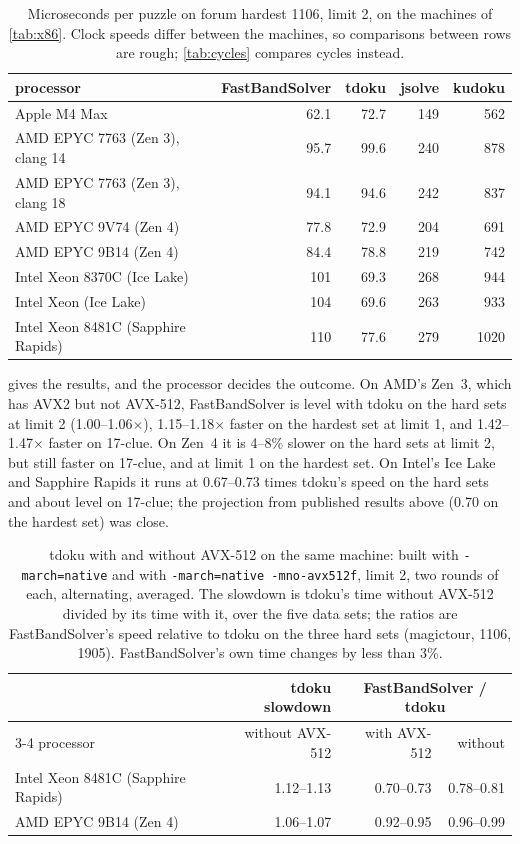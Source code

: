 \documentclass[11pt]{article}
\theoremstyle{definition}
\theoremstyle{plain}
\begin{document}
\begin{table}[t]
\centering
\caption{Microseconds per puzzle on forum hardest 1106, limit 2, on the machines of \cref{tab:x86}. Clock speeds differ
between the machines, so comparisons between rows are rough; \cref{tab:cycles} compares cycles instead.}
\label{tab:x86times}
\small
\begin{tabular}{lrrrr}
\toprule
processor & FastBandSolver & tdoku & jsolve & kudoku \\
\midrule
Apple M4 Max & 62.1 & 72.7 & 149 & 562 \\
\midrule
AMD EPYC 7763 (Zen 3), clang 14 & 95.7 & 99.6 & 240 & 878 \\
AMD EPYC 7763 (Zen 3), clang 18 & 94.1 & 94.6 & 242 & 837 \\
AMD EPYC 9V74 (Zen 4) & 77.8 & 72.9 & 204 & 691 \\
AMD EPYC 9B14 (Zen 4) & 84.4 & 78.8 & 219 & 742 \\
Intel Xeon 8370C (Ice Lake) & 101 & 69.3 & 268 & 944 \\
Intel Xeon (Ice Lake) & 104 & 69.6 & 263 & 933 \\
Intel Xeon 8481C (Sapphire Rapids) & 110 & 77.6 & 279 & 1020 \\
\bottomrule
\end{tabular}
\end{table}

 gives the results, and the processor decides the outcome. On AMD's Zen~3, which has AVX2 but not
AVX-512, FastBandSolver is level with tdoku on the hard sets at limit 2 (1.00--1.06$\times$), 1.15--1.18$\times$
faster on the hardest set at limit 1, and 1.42--1.47$\times$ faster on 17-clue. On Zen~4 it is 4--8\% slower on the
hard sets at limit 2, but still faster on 17-clue, and at limit 1 on the hardest set. On Intel's Ice Lake and Sapphire
Rapids it runs at 0.67--0.73 times tdoku's speed on the hard sets and about level on 17-clue; the projection from
published results above (0.70 on the hardest set) was close.

\begin{table}[t]
\centering
\caption{tdoku with and without AVX-512 on the same machine: built with \texttt{-march=native} and with
\texttt{-march=native -mno-avx512f}, limit 2, two rounds of each, alternating, averaged. The slowdown is tdoku's time
without AVX-512 divided by its time with it, over the five data sets; the ratios are FastBandSolver's speed relative
to tdoku on the three hard sets (magictour, 1106, 1905). FastBandSolver's own time changes by less than 3\%.}
\label{tab:avx512}
\small
\begin{tabular}{lrrr}
\toprule
& tdoku slowdown & \multicolumn{2}{c}{FastBandSolver / tdoku} \\
\cmidrule(lr){3-4}
processor & without AVX-512 & with AVX-512 & without \\
\midrule
Intel Xeon 8481C (Sapphire Rapids) & 1.12--1.13 & 0.70--0.73 & 0.78--0.81 \\
AMD EPYC 9B14 (Zen 4) & 1.06--1.07 & 0.92--0.95 & 0.96--0.99 \\
\bottomrule
\end{tabular}
\end{table}
\end{document}
